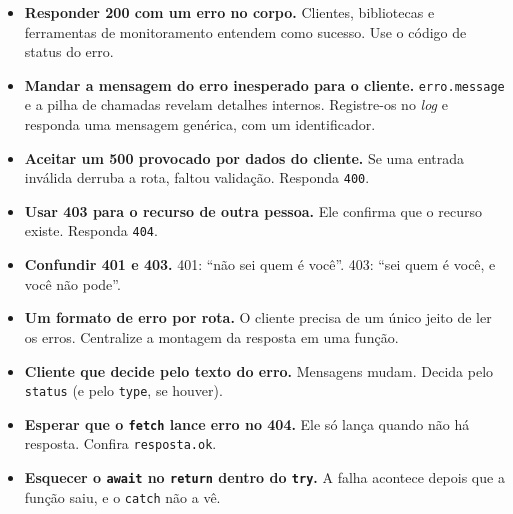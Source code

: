 \begin{itemize}
  \item \textbf{Responder 200 com um erro no corpo.} Clientes, bibliotecas e ferramentas de monitoramento entendem como sucesso. Use o código de status do erro.
  \item \textbf{Mandar a mensagem do erro inesperado para o cliente.} \texttt{erro.message} e a pilha de chamadas revelam detalhes internos. Registre-os no \textit{log} e responda uma mensagem genérica, com um identificador.
  \item \textbf{Aceitar um 500 provocado por dados do cliente.} Se uma entrada inválida derruba a rota, faltou validação. Responda \texttt{400}.
  \item \textbf{Usar 403 para o recurso de outra pessoa.} Ele confirma que o recurso existe. Responda \texttt{404}.
  \item \textbf{Confundir 401 e 403.} 401: ``não sei quem é você''. 403: ``sei quem é você, e você não pode''.
  \item \textbf{Um formato de erro por rota.} O cliente precisa de um único jeito de ler os erros. Centralize a montagem da resposta em uma função.
  \item \textbf{Cliente que decide pelo texto do erro.} Mensagens mudam. Decida pelo \texttt{status} (e pelo \texttt{type}, se houver).
  \item \textbf{Esperar que o \texttt{fetch} lance erro no 404.} Ele só lança quando não há resposta. Confira \texttt{resposta.ok}.
  \item \textbf{Esquecer o \texttt{await} no \texttt{return} dentro do \texttt{try}.} A falha acontece depois que a função saiu, e o \texttt{catch} não a vê.
\end{itemize}
